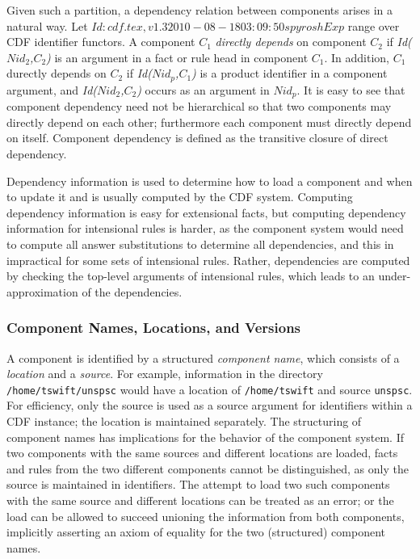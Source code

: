 Given such a partition, a dependency relation between components
arises in a natural way.  Let $Id: cdf.tex,v 1.3 2010-08-18 03:09:50 spyrosh Exp $ range over CDF identifier functors.
A component $C_1$ {\em directly depends} on component $C_2$ if {\em
Id($Nid_2$,$C_2$)} is an argument in a fact or rule head in component
$C_1$.  In addition, $C_1$ durectly depends on $C_2$ if {\em
Id($Nid_p$,$C_1$)} is a product identifier in a component argument,
and {\em Id($Nid_2$,$C_2$)} occurs as an argument in $Nid_p$.  It is
easy to see that component dependency need not be hierarchical so that
two components may directly depend on each other; furthermore each
component must directly depend on itself.  Component dependency is
defined as the transitive closure of direct dependency.

Dependency information is used to determine how to load a component
and when to update it and is usually computed by the CDF system.
Computing dependency information is easy for extensional facts, but
computing dependency information for intensional rules is harder, as
the component system would need to compute all answer substitutions to
determine all dependencies, and this in impractical for some sets of
intensional rules.  Rather, dependencies are computed by checking the
top-level arguments of intensional rules, which leads to an
under-approximation of the dependencies.

\subsubsection{Component Names, Locations, and Versions}

A component is identified by a structured {\em component name}, which
consists of a {\em location} and a {\em source}.  For example,
information in the directory {\tt /home/tswift/unspsc} would have a
location of {\tt /home/tswift} and source {\tt unspsc}.  For
efficiency, only the source is used as a source argument for
identifiers within a CDF instance; the location is maintained
separately.  The structuring of component names has implications for
the behavior of the component system.  If two components with the same
sources and different locations are loaded, facts and rules from the
two different components cannot be distinguished, as only the source
is maintained in identifiers.  The attempt to load two such components
with the same source and different locations can be treated as an
error; or the load can be allowed to succeed unioning the information
from both components, implicitly asserting an axiom of equality for
the two (structured) component names.

